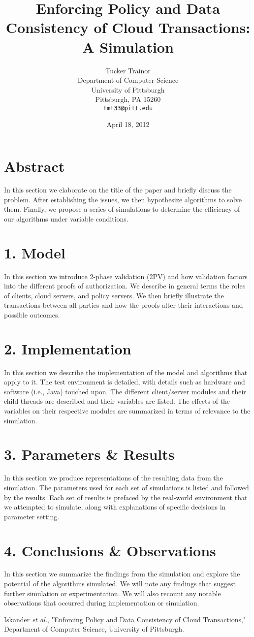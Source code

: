 \documentclass[11pt]{article}
\title{Enforcing Policy and Data Consistency of Cloud Transactions: A Simulation}
\author{Tucker Trainor\\Department of Computer Science\\University of Pittsburgh\\Pittsburgh, PA 15260\\\texttt{tmt33@pitt.edu}}
\date{April 18, 2012} %
\begin{document}
\maketitle
\section{Abstract}
In this section we elaborate on the title of the paper and briefly discuss the problem. After establishing the issues, we then hypothesize algorithms to solve them. Finally, we propose a series of simulations to determine the efficiency of our algorithms under variable conditions.
\section{1. Model}
In this section we introduce 2-phase validation (2PV) \cite{Iskander} and how validation factors into the different proofs of authorization. We describe in general terms the roles of clients, cloud servers, and policy servers. We then briefly illustrate the transactions between all parties and how the proofs alter their interactions and possible outcomes.
\section{2. Implementation}
In this section we describe the implementation of the model and algorithms that apply to it. The test environment is detailed, with details such as hardware and software (i.e., Java) touched upon. The different client/server modules and their child threads are described and their variables are listed. The effects of the variables on their respective modules are summarized in terms of relevance to the simulation.
\section{3. Parameters \& Results}
In this section we produce representations of the resulting data from the simulation. The parameters used for each set of simulations is listed and followed by the results. Each set of results is prefaced by the real-world environment that we attempted to simulate, along with explanations of specific decisions in parameter setting.
\section{4. Conclusions \& Observations}
In this section we summarize the findings from the simulation and explore the potential of the algorithms simulated. We will note any findings that suggest further simulation or experimentation. We will also recount any notable observations that occurred during implementation or simulation.
\begin{thebibliography}{9}
 Iskander \emph{et al.}, "Enforcing Policy and Data Consistency of Cloud Transactions," Department of Computer Science, University of Pittsburgh.
\end{thebibliography}
\end{document}
